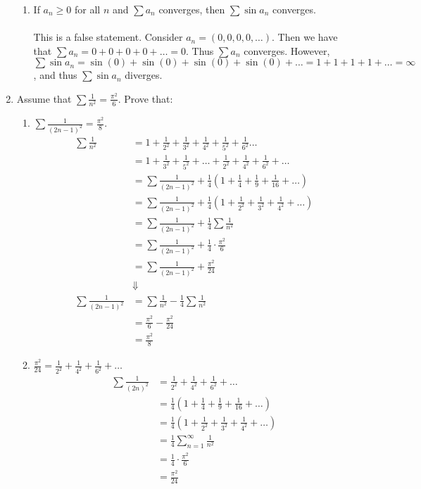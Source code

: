 \documentclass[12pt,letterpaper]{article}
\theoremstyle{case}
\theoremstyle{definition}
\begin{document}
\begin{enumerate}
\begin{enumerate}
			\item If $a_n \geq 0$ for all $n$ and $\sum a_n$ converges, then $\sum \sin a_n$ converges.
			\\\\This is a false statement. Consider $a_n=(0,0,0,0,\dots)$. Then we have that $\sum a_n=0+0+0+0+\dots=0$. Thus $\sum a_n$ converges. However, $\sum \sin a_n= \sin(0)+\sin(0)+\sin(0)+\sin(0)+\dots = 1 + 1 + 1 + 1 + \dots = \infty$, and thus $\sum \sin a_n$ diverges.\\
		\end{enumerate}
	
		\item Assume that $\sum \frac{1}{n^2} = \frac{\pi^2}{6}$. Prove that:
		\begin{enumerate}
			\item $\displaystyle \sum \frac{1}{(2n-1)^2}=\frac{\pi^2}{8}$.
			\begin{align*}
				\sum \frac{1}{n^2} &= 1+\frac{1}{2^2} +\frac{1}{3^2}+\frac{1}{4^2} + \frac{1}{5^2}+\frac{1}{6^2} \dots \\
				&= 1+\frac{1}{3^2}+\frac{1}{5^2}+\dots+\frac{1}{2^2}+\frac{1}{4^2}+\frac{1}{6^2}+\dots \\
				&= \sum \frac{1}{(2n-1)^2} + \frac{1}{4}\left(1+\frac{1}{4}+\frac{1}{9}+\frac{1}{16}+\dots\right) \\
				&= \sum \frac{1}{(2n-1)^2} + \frac{1}{4}\left(1+\frac{1}{2^2}+\frac{1}{3^2}+\frac{1}{4^2}+\dots\right) \\
				&= \sum \frac{1}{(2n-1)^2} + \frac{1}{4} \sum \frac{1}{n^2} \\
				&= \sum \frac{1}{(2n-1)^2} + \frac{1}{4} \cdot \frac{\pi^2}{6} \\
				&= \sum \frac{1}{(2n-1)^2} + \frac{\pi^2}{24} \\
				&\Downarrow \\
				\sum \frac{1}{(2n-1)^2} &= \sum \frac{1}{n^2} - \frac{1}{4} \sum \frac{1}{n^2} \\
				&= \frac{\pi^2}{6} - \frac{\pi^2}{24} \\
				&= \frac{\pi^2}{8}
			\end{align*}
			
			\item $\displaystyle\frac{\pi^2}{24}=\frac{1}{2^2} + \frac{1}{4^2} + \frac{1}{6^2}+\dots$
			\begin{align*}
				\sum \frac{1}{(2n)^2} &= \frac{1}{2^2} + \frac{1}{4^2}+\frac{1}{6^2}+ \dots \\
				&= \frac{1}{4} \left(1+\frac{1}{4}+\frac{1}{9}+\frac{1}{16}+\dots\right) \\
				&= \frac{1}{4} \left(1+\frac{1}{2^2}+\frac{1}{3^2}+\frac{1}{4^2}+\dots\right) \\
				&= \frac{1}{4}\sum_{n=1}^{\infty} \frac{1}{n^2} \\
				&= \frac{1}{4} \cdot \frac{\pi^2}{6} \\
				&= \frac{\pi^2}{24}
			\end{align*}
			

\end{enumerate}
\end{enumerate}
\end{document}
